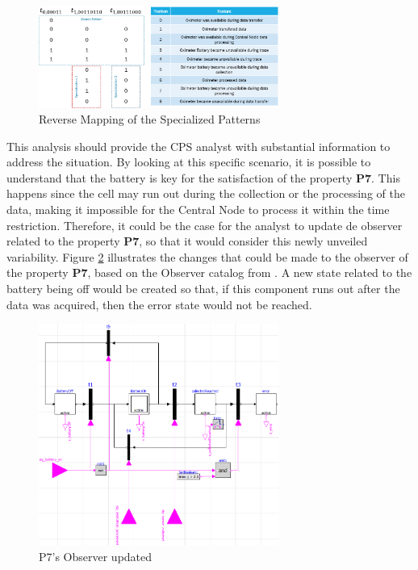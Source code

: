 \begin{figure}[!h]
	\centering
	\includegraphics[width=0.7\textwidth, keepaspectratio]{img/pattern_specialization_reverse_map.png}
	\caption{Reverse Mapping  of the Specialized Patterns}
	\label{fig:ev_pattern_spec_reverse_mapping}
\end{figure}

This analysis should provide the CPS analyst with substantial information to address the situation. By looking at this specific scenario, it is possible to understand that the battery is key for the satisfaction of the property \textbf{P7}. This happens since the cell may run out during the collection or the processing of the data, making it impossible for the Central Node to process it within the time restriction. Therefore, it could be the case for the analyst to update de observer related to the property \textbf{P7}, so that it would consider this newly unveiled variability. Figure \ref{fig:ev_observer_fxd} illustrates the changes that could be made to the observer of the property \textbf{P7}, based on the Observer catalog from \cite{2022PSP}. A new state related to the battery being off would be created so that, if this component runs out after the data was acquired, then the error state would not be reached.

\begin{figure}[]
	\centering
	\includegraphics[width=0.7\textwidth, keepaspectratio]{img/observer_fxd.png}
	\caption{P7's Observer updated}
	\label{fig:ev_observer_fxd}
\end{figure}

